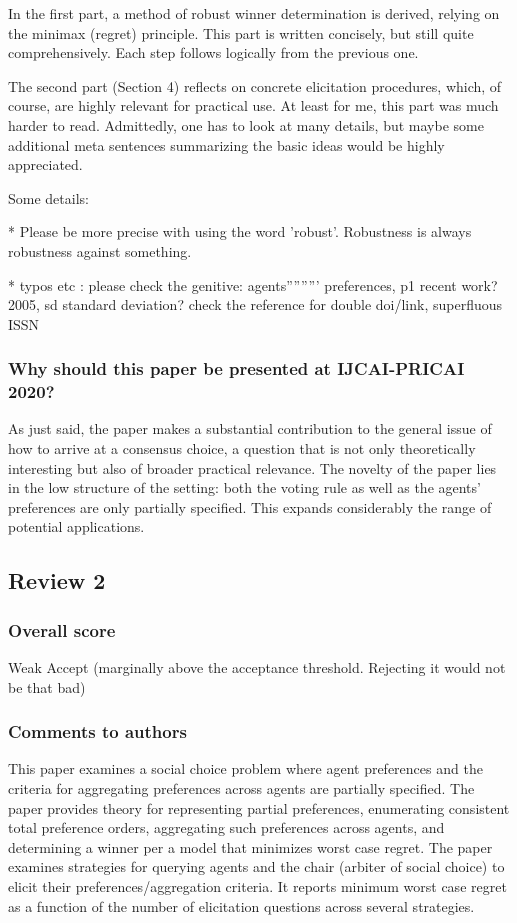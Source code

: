 \documentclass[version=3.21, pagesize, twoside=off, bibliography=totoc, DIV=calc, fontsize=12pt, a4paper]{scrartcl}
\begin{document}
In the first part, a method of robust winner determination is derived, relying on the minimax (regret) principle. This part is written concisely, but still quite comprehensively. Each step follows logically from the previous one.

The second part (Section 4) reflects on concrete elicitation procedures, which, of course, are highly relevant for practical use. At least for me, this part was much harder to read. Admittedly, one has to look at many details, but maybe some additional meta sentences summarizing the basic ideas would be highly appreciated.

Some details:

* Please be more precise with using the word 'robust'. Robustness is always robustness against something.

* typos etc : please check the genitive: agents''''''''' preferences,
p1 recent work? 2005,
sd standard deviation?
check the reference for double doi/link, superfluous ISSN



\subsubsection*{Why should this paper be presented at IJCAI-PRICAI 2020?}
As just said, the paper makes a substantial contribution to the general issue of how to arrive at a consensus choice, a question that is not only theoretically interesting but also of broader practical relevance. The novelty of the paper lies in the low structure of the setting: both the voting rule as well as the agents' preferences are only partially specified. This expands considerably the range of potential applications.

\subsection{Review 2}
\subsubsection*{Overall score}
Weak Accept (marginally above the acceptance threshold. Rejecting it would not be that bad)
\subsubsection*{Comments to authors}
This paper examines a social choice problem where agent preferences and the criteria for aggregating preferences across agents are partially specified. The paper provides theory for representing partial preferences, enumerating consistent total preference orders, aggregating such preferences across agents, and determining a winner per a model that minimizes worst case regret. The paper examines strategies for querying agents and the chair (arbiter of social choice) to elicit their preferences/aggregation criteria. It reports minimum worst case regret as a function of the number of elicitation questions across several strategies.
\end{document}
